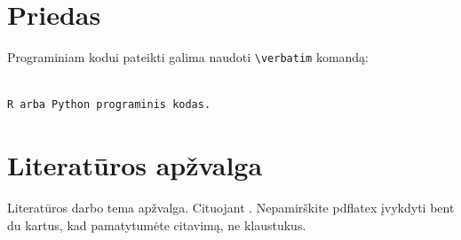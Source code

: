 \documentclass[12pt]{article}
\begin{document}

\section{Priedas}
Programiniam kodui pateikti galima naudoti  \verb|\verbatim| komandą:
\small  %
\begin{verbatim}

R arba Python programinis kodas.

\end{verbatim}



\section{Literatūros apžvalga}
Literatūros darbo tema apžvalga. Cituojant \cite{YLS16,KGDD08}. Nepamirškite pdflatex įvykdyti bent du kartus, kad pamatytumėte citavimą, ne klaustukus.
\end{document}
